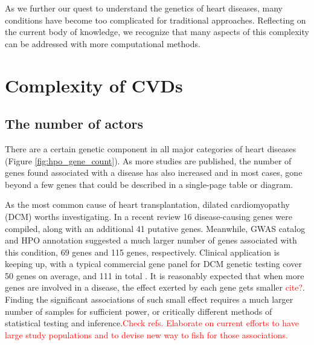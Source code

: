 \documentclass[letter]{bioinfo}
\newcommand{\comment}[1]{\textcolor{red}{#1}}
\begin{document}

As we further our quest to understand the genetics of heart diseases, many conditions have become too complicated for traditional approaches. Reflecting on the current body of knowledge, we recognize that many aspects of this complexity can be addressed with more computational methods.

\section{Complexity of CVDs}  %

\subsection{The number of actors}

% 
There are a certain genetic component in all major categories of heart diseases (Figure \ref{fig:hpo_gene_count}). As more studies are published, the number of genes found associated with a disease has also increased and in most cases, gone beyond a few genes that could be described in a single-page table or diagram.

As the most common cause of heart transplantation, dilated cardiomyopathy (DCM) worths investigating. In a recent review \citep{Burke:2016:Clinical} 16 disease-causing genes were compiled, along with an additional 41 putative genes. Meanwhile, GWAS catalog and HPO annotation suggested a much larger number of genes associated with this condition, 69 genes and 115 genes, respectively. Clinical application is keeping up, with a typical commercial gene panel for DCM genetic testing cover 50 genes on average, and 111 in total \citep{McNally:2017:Dilated}.
It is reasonably expected that when more genes are involved in a disease, the effect exerted by each gene gets smaller \comment{cite?}. Finding the significant associations of such small effect requires a much larger number of samples for sufficient power, or critically different methods of statistical testing and inference.\comment{Check refs. Elaborate on current efforts to have large study populations and to devise new way to fish for those associations.}
\end{document}
